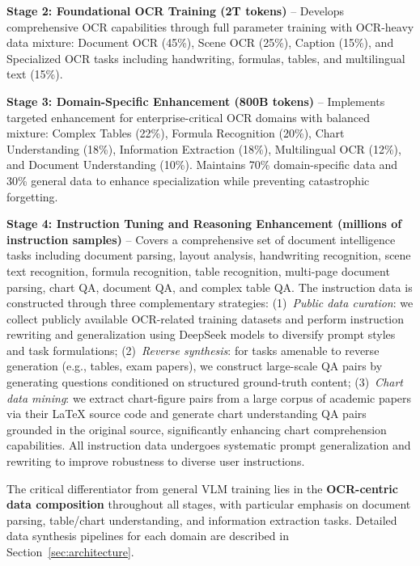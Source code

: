 \documentclass[dvipsnames]{article}
\begin{document}
\textbf{Stage 2: Foundational OCR Training (2T tokens)} -- Develops comprehensive OCR capabilities through full parameter training with OCR-heavy data mixture: Document OCR (45\%), Scene OCR (25\%), Caption (15\%), and Specialized OCR tasks including handwriting, formulas, tables, and multilingual text (15\%).

\textbf{Stage 3: Domain-Specific Enhancement (800B tokens)} -- Implements targeted enhancement for enterprise-critical OCR domains with balanced mixture: Complex Tables (22\%), Formula Recognition (20\%), Chart Understanding (18\%), Information Extraction (18\%), Multilingual OCR (12\%), and Document Understanding (10\%). Maintains 70\% domain-specific data and 30\% general data to enhance specialization while preventing catastrophic forgetting.

\textbf{Stage 4: Instruction Tuning and Reasoning Enhancement (millions of instruction samples)} -- Covers a comprehensive set of document intelligence tasks including document parsing, layout analysis, handwriting recognition, scene text recognition, formula recognition, table recognition, multi-page document parsing, chart QA, document QA, and complex table QA. The instruction data is constructed through three complementary strategies: (1)~\textit{Public data curation}: we collect publicly available OCR-related training datasets and perform instruction rewriting and generalization using DeepSeek models to diversify prompt styles and task formulations; (2)~\textit{Reverse synthesis}: for tasks amenable to reverse generation (e.g., tables, exam papers), we construct large-scale QA pairs by generating questions conditioned on structured ground-truth content; (3)~\textit{Chart data mining}: we extract chart-figure pairs from a large corpus of academic papers via their LaTeX source code and generate chart understanding QA pairs grounded in the original source, significantly enhancing chart comprehension capabilities. All instruction data undergoes systematic prompt generalization and rewriting to improve robustness to diverse user instructions.


The critical differentiator from general VLM training lies in the \textbf{OCR-centric data composition} throughout all stages, with particular emphasis on document parsing, table/chart understanding, and information extraction tasks.
Detailed data synthesis pipelines for each domain are described in Section~\ref{sec:architecture}.
\end{document}
